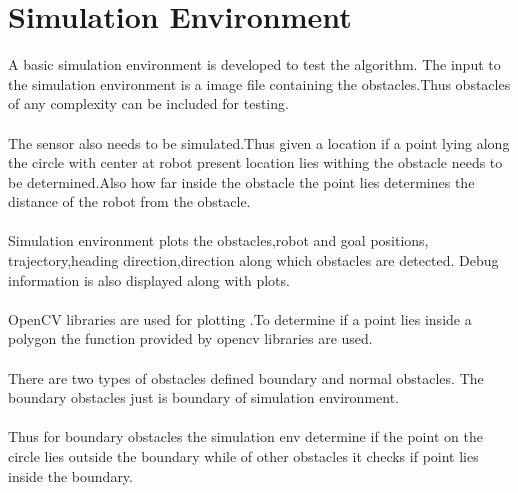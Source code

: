 \documentclass[fontsize=12pt, %
                             paper=a4, %
                             oneside, %
                             captions=tableheading,
                             index=totoc,
                             hyperref]{labbook}
\begin{document}
\section{Simulation Environment}
A basic simulation environment is developed to test the algorithm.
The input to the simulation environment is a image file containing
the obstacles.Thus obstacles of any complexity can be included
for testing.
\\\\
The sensor also needs to be simulated.Thus given a location
if a point lying along the circle with center at robot present location
lies withing the obstacle needs to be determined.Also how far
inside the obstacle the point lies determines the distance of
the robot from the obstacle.
\\\\
Simulation environment plots the obstacles,robot and goal positions,
trajectory,heading direction,direction along which obstacles are detected.
Debug information is also displayed along with plots.
\\\\
OpenCV libraries are used for plotting .To determine if a point lies inside
a polygon the function provided by opencv libraries are used.
\\\\
There are two types of obstacles defined boundary and normal obstacles.
The boundary obstacles just is boundary of simulation environment.
\\\\
Thus for boundary obstacles the simulation env determine if the point
on the circle lies outside the boundary while of other obstacles
it checks if point lies inside the boundary.
\\\\
\end{document}
